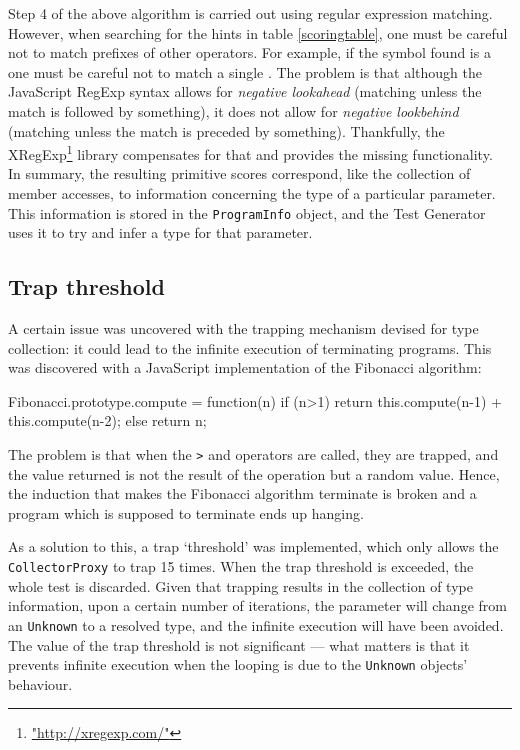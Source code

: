 Step 4 of the above algorithm is carried out using regular expression matching. However, when searching for the hints in table \ref{scoringtable}, one must be careful not to match prefixes of other operators. For example, if the symbol found is a \texttt{\textendash\textendash} one must be careful not to match a single \texttt{\textendash}. The problem is that although the JavaScript RegExp syntax allows for \emph{negative lookahead} (matching unless the match is followed by something), it does not allow for \emph{negative lookbehind} (matching unless the match is preceded by something). Thankfully, the \textsf{XRegExp}\footnote{\url{"http://xregexp.com/"}} library compensates for that and provides the missing functionality.\\

In summary, the resulting primitive scores correspond, like the collection of member accesses, to information concerning the type of a particular parameter. This information is stored in the \texttt{ProgramInfo} object, and the \textsf{Test Generator} uses it to try and infer a type for that parameter.

\subsection{Trap threshold}
A certain issue was uncovered with the trapping mechanism devised for type collection: it could lead to the infinite execution of terminating programs. This was discovered with a JavaScript implementation of the Fibonacci algorithm:

\begin{code}[caption=Fibonacci in JavaScript]
Fibonacci.prototype.compute = function(n) {
    if (n>1) return this.compute(n-1) + this.compute(n-2);
    else return n;
}
\end{code}

The problem is that when the \texttt{>} and \texttt{\textendash} operators are called, they are trapped, and the value returned is not the result of the operation but a random value. Hence, the induction that makes the Fibonacci algorithm terminate is broken and a program which is supposed to terminate ends up hanging.

As a solution to this, a trap `threshold' was implemented, which only allows the \texttt{CollectorProxy} to trap 15 times. When the trap threshold is exceeded, the whole test is discarded. Given that trapping results in the collection of type information, upon a certain number of iterations, the parameter will change from an \texttt{Unknown} to a resolved type, and the infinite execution will have been avoided. The value of the trap threshold is not significant --- what matters is that it prevents infinite execution when the looping is due to the \texttt{Unknown} objects' behaviour.

